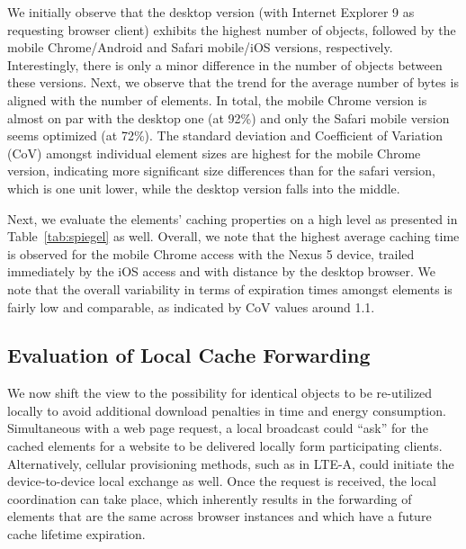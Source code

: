 \documentclass[letterpaper,conference]{IEEEtran}
\begin{document}
We initially observe that the desktop version (with Internet Explorer 9 as requesting browser client) exhibits the highest number of objects, followed by the mobile Chrome/Android and Safari mobile/iOS versions, respectively. 
Interestingly, there is only a minor difference in the number of objects between these versions.
Next, we observe that the trend for the average number of bytes is aligned with the number of elements. 
In total, the mobile Chrome version is almost on par with the desktop one (at 92\%) and only the Safari mobile version seems optimized (at 72\%).
The standard deviation and Coefficient of Variation (CoV) amongst individual element sizes are highest for the mobile Chrome version, indicating more significant size differences than for the safari version, which is one unit lower, while the desktop version falls into the middle.

Next, we evaluate the elements' caching properties on a high level as presented in Table~\ref{tab:spiegel} as well. 
Overall, we note that the highest average caching time is observed for the mobile Chrome access with the Nexus 5 device, trailed immediately by the iOS access and with distance by the desktop browser.
We note that the overall variability in terms of expiration times amongst elements is fairly low and comparable, as indicated by CoV values around 1.1.

\subsection{Evaluation of Local Cache Forwarding}
We now shift the view to the possibility for identical objects to be re-utilized locally to avoid additional download penalties in time and energy consumption.
Simultaneous with a web page request, a local broadcast could ``ask'' for the cached elements for a website to be delivered locally form participating clients. Alternatively, cellular provisioning methods, such as in LTE-A, could initiate the device-to-device local exchange as well.
Once the request is received, the local coordination can take place, which inherently results in the forwarding of elements that are the same across browser instances and which have a future cache lifetime expiration.
\end{document}
